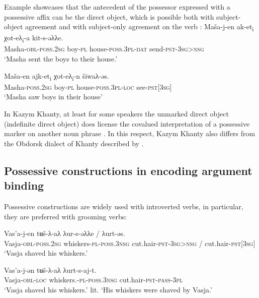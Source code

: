 \documentclass[output=paper]{langscibook}
\begin{document}
Example  showcases that the antecedent of the possessor expressed with a possessive affix can be the direct object, which is possible both with subject-object agreement  and with subject-only agreement on the verb :
\ea 
\label{ex:Volkova:61}
	\ea
	\label{ex:Volkova:61a}
  	 \gll Maša-j-en ak-et\textsubscript{i} χot-eλ\textsubscript{i}{}-a kit{}-s{}-əλλe.\\
  	 Masha\textsc{{}-obl-poss.2sg} boy\textsc{{}-pl} house\textsc{{}-poss.3pl-dat} send\textsc{{}-pst-3sg>nsg}\\
  	 \glt ‘Masha sent the boys to their house.’

	\ex
	\label{ex:Volkova:61b}
  	 \gll Maša{}-en ajk{}-et\textsubscript{i} χot{}-eλ\textsubscript{i}{}-n   šiwaλ{}-əs.\\
  	 Masha\textsc{{}-poss.2sg} boy\textsc{{}-pl} house\textsc{{}-poss.3pl-loc} see\textsc{{}-pst[}3\textsc{sg}]\\
  	 \glt ‘Masha saw boys in their house’
	\z
\z

In Kazym Khanty, at least for some speakers the unmarked direct object (indefinite direct object) does license the covalued interpretation of a possessive marker on another noun phrase . In this respect, Kazym Khanty also differs from the Obdorsk dialect of Khanty described by \citet{Nikolaeva1999Ostyak}.

\subsection{{Possessive} {constructions} {in} {encoding} {argument} {binding}}\label{sec:Volkova:6.2}

Possessive constructions are widely used with introverted verbs, in particular, they are preferred with grooming verbs:


\ea 
\label{ex:Volkova:62}
	\ea
	\label{ex:Volkova:62a}
  	 \gll Vas’a-j-en tʉš-λ-aλ  λur-s-əλλe  / λurt-əs.\\
  	 Vasja-\textsc{obl-poss.2sg} whiskers\textsc{{}-pl-poss.3nsg} cut.hair\textsc{{}-pst-3sg>nsg} / cut.hair\textsc{{}-pst[}3\textsc{sg}]\\
  	 \glt ‘Vasja shaved his whiskers.’

	\ex
	\label{ex:Volkova:62b}
  	 \gll Vas’a-j-ən tʉš-λ-aλ  λurt-s-aj-t.\\
  	 Vasja\textsc{{}-obl-loc} whiskers.\textsc{{}-pl-poss.3nsg} cut.hair\textsc{{}-pst-pass-3pl}\\
  	 \glt ‘Vasja shaved his whiskers.’ lit. ‘His whiskers were shaved by Vasja.’
	\z
\z
 
\end{document}
